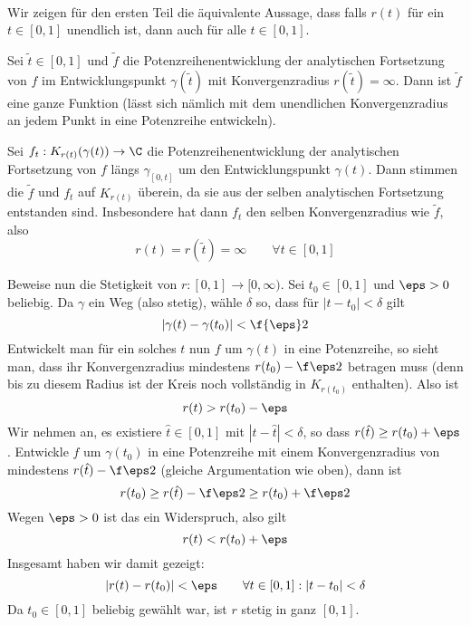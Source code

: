 \documentclass{mywork}
\begin{document}
	\setcounter{section}{8}

	\begin{aufgabe}~

		Wir zeigen für den ersten Teil die äquivalente Aussage, dass falls $r(t)$ für ein $t\in [0,1]$ unendlich ist, dann auch für alle $t\in [0,1]$.

		Sei $\tilde t \in [0,1]$ und $\tilde f$ die Potenzreihenentwicklung der analytischen Fortsetzung von $f$ im Entwicklungspunkt $\gamma(\tilde t)$ mit Konvergenzradius $r(\tilde t) = \infty$.
		Dann ist $\tilde f$ eine ganze Funktion (lässt sich nämlich mit dem unendlichen Konvergenzradius an jedem Punkt in eine Potenzreihe entwickeln).

		Sei $f_t: K_{r(t)}(\gamma(t)) \to \C$ die Potenzreihenentwicklung der analytischen Fortsetzung von $f$ längs $\gamma_{[0,t]}$ um den Entwicklungspunkt $\gamma(t)$.
		Dann stimmen die $\tilde f$ und $f_t$ auf $K_{r(t)}$ überein, da sie aus der selben analytischen Fortsetzung entstanden sind.
		Insbesondere hat dann $f_t$ den selben Konvergenzradius wie $\tilde f$, also
		\[
			r(t) = r(\tilde t) = \infty
			\qquad \forall t \in [0,1]
		\]

		Beweise nun die Stetigkeit von $r:[0,1] \to [0,\infty)$.
		Sei $t_0 \in [0,1]$ und $\eps > 0$ beliebig.
		Da $\gamma$ ein Weg (also stetig), wähle $\delta$ so, dass für $|t-t_0|<\delta$ gilt
		\[
			|\gamma(t) - \gamma(t_0)| < \f {\eps}2
		\]
		Entwickelt man für ein solches $t$ nun $f$ um $\gamma(t)$ in eine Potenzreihe, so sieht man, dass ihr Konvergenzradius mindestens $r(t_0) - \f \eps 2$ betragen muss (denn bis zu diesem Radius ist der Kreis noch vollständig in $K_{r(t_0)}$ enthalten).
		Also ist 
		\[
			r(t) > r(t_0) - \eps
		\]
		Wir nehmen an, es existiere $\hat t \in [0,1]$ mit $|t - \hat t| < \delta$, so dass $r(\hat t) \ge r(t_0) + \eps$.
		Entwickle $f$ um $\gamma(t_0)$ in eine Potenzreihe mit einem Konvergenzradius von mindestens $r(\hat t) - \f \eps 2$ (gleiche Argumentation wie oben), dann ist
		\[
			r(t_0) \ge r(\hat t) - \f \eps 2 \ge r(t_0) + \f \eps 2
		\]
		Wegen $\eps > 0$ ist das ein Widerspruch, also gilt 
		\[
			r(t) < r(t_0) + \eps
		\]
		Insgesamt haben wir damit gezeigt:
		\[
			|r(t) - r(t_0)| < \eps
			\qquad \forall t\in[0,1]: |t-t_0| < \delta
		\]
		Da $t_0\in [0,1]$ beliebig gewählt war, ist $r$ stetig in ganz $[0,1]$.
	\end{aufgabe}

	\newpage
	
\end{document}
